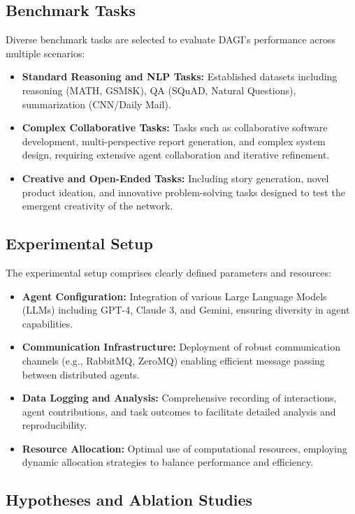 \documentclass[12pt]{amsart}
\begin{document}
\subsection{Benchmark Tasks}

Diverse benchmark tasks are selected to evaluate DAGI’s performance across multiple scenarios:

\begin{itemize}
    \item \textbf{Standard Reasoning and NLP Tasks:} Established datasets including reasoning (MATH, GSM8K), QA (SQuAD, Natural Questions), summarization (CNN/Daily Mail).
    \item \textbf{Complex Collaborative Tasks:} Tasks such as collaborative software development, multi-perspective report generation, and complex system design, requiring extensive agent collaboration and iterative refinement.
    \item \textbf{Creative and Open-Ended Tasks:} Including story generation, novel product ideation, and innovative problem-solving tasks designed to test the emergent creativity of the network.
\end{itemize}

\subsection{Experimental Setup}

The experimental setup comprises clearly defined parameters and resources:

\begin{itemize}
    \item \textbf{Agent Configuration:} Integration of various Large Language Models (LLMs) including GPT-4, Claude 3, and Gemini, ensuring diversity in agent capabilities.
    \item \textbf{Communication Infrastructure:} Deployment of robust communication channels (e.g., RabbitMQ, ZeroMQ) enabling efficient message passing between distributed agents.
    \item \textbf{Data Logging and Analysis:} Comprehensive recording of interactions, agent contributions, and task outcomes to facilitate detailed analysis and reproducibility.
    \item \textbf{Resource Allocation:} Optimal use of computational resources, employing dynamic allocation strategies to balance performance and efficiency.
\end{itemize}

\subsection{Hypotheses and Ablation Studies}
\end{document}

